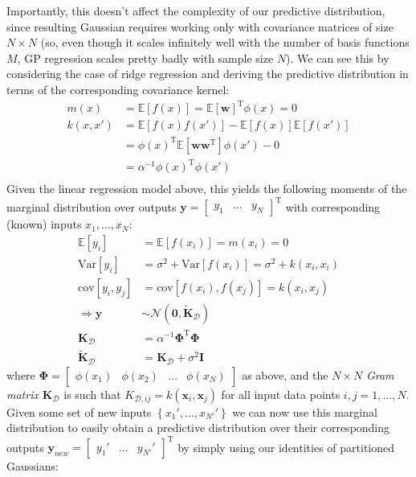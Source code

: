 \documentclass[a4paper]{article}
\begin{document}
Importantly, this doesn't affect the complexity of our predictive distribution, since resulting Gaussian requires working only with covariance matrices of size $N\times N$ (so, even though it scales infinitely well with the number of basis functions $M$, GP regression scales pretty badly with sample size $N$). We can see this by considering the case of ridge regression and deriving the predictive distribution in terms of the corresponding covariance kernel:
\begin{align*}
m(x) &= \mathbb{E}[f(x)] = \mathbb{E}[\mathbf{w}]^\textrm{T}\phi(x) = 0 \\
k(x,x') &= \mathbb{E}[f(x)f(x')] - \mathbb{E}[f(x)]\mathbb{E}[f(x')] \\
&= \phi(x)^\textrm{T}\mathbb{E}[\mathbf{ww}^\textrm{T}]\phi(x') - 0 \\
&= \alpha^{-1}\phi(x)^\textrm{T}\phi(x') \\
\end{align*}
Given the linear regression model above, this yields the following moments of the marginal distribution over outputs $\mathbf{y} = \begin{bmatrix}y_1 & \ldots& y_N\end{bmatrix}^\textrm{T}$ with corresponding (known) inputs $x_1,\ldots,x_N$:
\begin{align*}
\mathbb{E}[y_i] &= \mathbb{E}[f(x_i)] = m(x_i) = 0 \\
\textrm{Var}[y_i] &= \sigma^2 + \textrm{Var}[f(x_i)] = \sigma^2 + k(x_i,x_i) \\
\textrm{cov}[y_i,y_j] &= \textrm{cov}[f(x_i),f(x_j)] = k(x_i,x_j) \\
\Rightarrow \mathbf{y} &\sim \mathcal{N}(\mathbf{0},\tilde{\mathbf{K}}_\mathcal{D}) \\
\mathbf{K}_\mathcal{D} &= \alpha^{-1}\mathbf{\Phi}^\textrm{T}\mathbf{\Phi} \\
\tilde{\mathbf{K}}_\mathcal{D} &= \mathbf{K}_\mathcal{D}+\sigma^2\mathbf{I}
\end{align*}
where $\mathbf{\Phi} = \begin{bmatrix} \phi(x_1) & \phi(x_2) & \ldots & \phi(x_N) \end{bmatrix}$ as above, and the $N\times N$ \emph{Gram matrix} $\mathbf{K}_\mathcal{D}$ is such that $K_{\mathcal{D},ij} = k(\mathbf{x}_i,\mathbf{x}_j)$ for all input data points $i,j = 1,\ldots,N$. Given some set of new inputs $\left\{x_1', \ldots, x_{N'}'\right\}$ we can now use this marginal distribution to easily obtain a predictive distribution over their corresponding outputs $\mathbf{y}_{new}=\begin{bmatrix} y_1' &\ldots & y_{N'}'\end{bmatrix}^\textrm{T}$ by simply using our identities of partitioned Gaussians:
\end{document}
